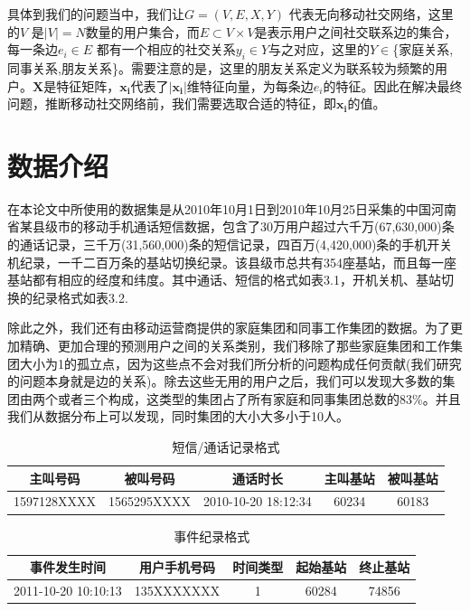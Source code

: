 具体到我们的问题当中，我们让$G = (V, E, X, Y)$ 代表无向移动社交网络，这里的$V$ 是$|V| = N$数量的用户集合，而$E \subset V \times V$是表示用户之间社交联系边的集合，每一条边$e_i \in E$ 都有一个相应的社交关系$y_i \in Y$与之对应，这里的$Y \in $\{家庭关系, 同事关系,朋友关系\}。需要注意的是，这里的朋友关系定义为联系较为频繁的用户。$\textbf{X}$是特征矩阵，$\bm{x_i}$代表了$|\bm{x_i}|$维特征向量，为每条边$e_i$的特征。因此在解决最终问题，推断移动社交网络前，我们需要选取合适的特征，即$\bm{x_i}$的值。



\section{数据介绍}
在本论文中所使用的数据集是从2010年10月1日到2010年10月25日采集的中国河南省某县级市的移动手机通话短信数据，包含了30万用户超过六千万(67,630,000)条的通话记录，三千万(31,560,000)条的短信记录，四百万(4,420,000)条的手机开关机纪录，一千二百万条的基站切换纪录。该县级市总共有354座基站，而且每一座基站都有相应的经度和纬度。其中通话、短信的格式如表3.1，开机关机、基站切换的纪录格式如表3.2.




除此之外，我们还有由移动运营商提供的家庭集团和同事工作集团的数据。为了更加精确、更加合理的预测用户之间的关系类别，我们移除了那些家庭集团和工作集团大小为1的孤立点，因为这些点不会对我们所分析的问题构成任何贡献(我们研究的问题本身就是边的关系)。除去这些无用的用户之后，我们可以发现大多数的集团由两个或者三个构成，这类型的集团占了所有家庭和同事集团总数的83\%。并且我们从数据分布上可以发现，同时集团的大小大多小于10人。


\begin{table}
    \centering
    \caption{短信/通话记录格式}
    \label{call-record}
    \begin{tabular}{c|c|c|c|c}
        \hline
        主叫号码 & 被叫号码 & 通话时长 & 主叫基站 & 被叫基站 \\ \hline
        1597128XXXX & 1565295XXXX & 2010-10-20 18:12:34 & 60234 & 60183 \\ \hline
    \end{tabular}
\end{table}


\begin{table}
    \centering
    \caption{事件纪录格式}
    \label{event-record}
    \begin{tabular}{c|c|c|c|c}
    \hline
    事件发生时间 & 用户手机号码 & 时间类型 & 起始基站 & 终止基站 \\ \hline
    2011-10-20 10:10:13   & 135XXXXXXX & 1 & 60284 & 74856  \\ \hline
    \end{tabular}
\end{table}



